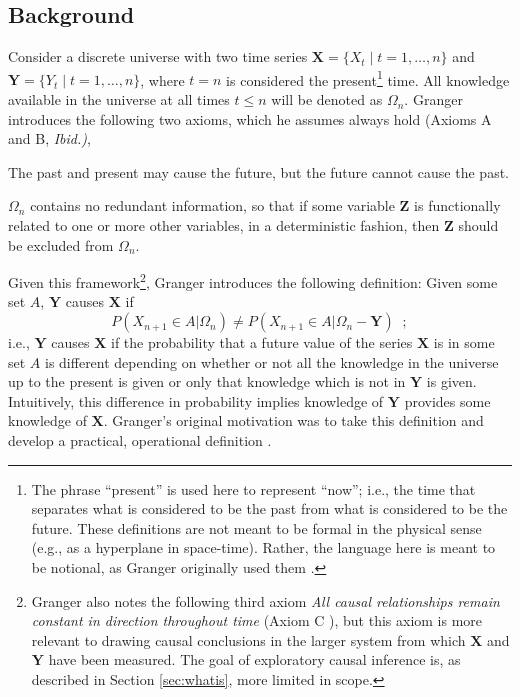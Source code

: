 \subsection{Background}
\label{sec:GCback}
Consider a discrete universe with two time series $\mathbf{X}=\{X_t\;|\; t=1,\ldots,n\}$ and $\mathbf{Y}=\{Y_t\;|\; t=1,\ldots,n\}$, where $t=n$ is considered the present\footnote{The phrase ``present'' is used here to represent ``now''; i.e., the time that separates what is considered to be the past from what is considered to be the future.  These definitions are not meant to be formal in the physical sense (e.g., as a hyperplane in space-time).  Rather, the language here is meant to be notional, as Granger originally used them \cite{Granger1980}.} time.  All knowledge available in the universe at all times $t\le n$ will be denoted as $\Omega_n$.  Granger introduces the following two axioms, which he assumes always hold \cite{Granger1980} (Axioms A and B, {\em Ibid.)},
\begin{ax}
The past and present may cause the future, but the future cannot cause the past. 
\end{ax}
\begin{ax}
$\Omega_n$ contains no redundant information, so that if some variable $\mathbf{Z}$ is functionally related to one or more other variables, in a deterministic fashion, then $\mathbf{Z}$ should be excluded from $\Omega_n$. 
\end{ax}

Given this framework\footnote{Granger also notes the following third axiom {\em All causal relationships remain constant in direction throughout time} (Axiom C \cite{Granger1980}), but this axiom is more relevant to drawing causal conclusions in the larger system from which $\mathbf{X}$ and $\mathbf{Y}$ have been measured.  The goal of exploratory causal inference is, as described in Section \ref{sec:whatis}, more limited in scope.}, Granger introduces the following definition: Given some set $A$, $\mathbf{Y}$ causes $\mathbf{X}$ if
\begin{equation}
\label{eq:GCdef}
P(X_{n+1}\in A|\Omega_n) \neq P(X_{n+1}\in A|\Omega_n-\mathbf{Y})\;\;;
\end{equation}
i.e., $\mathbf{Y}$ causes $\mathbf{X}$ if the probability that a future value of the series $\mathbf{X}$ is in some set $A$ is different depending on whether or not all the knowledge in the universe up to the present is given or only that knowledge which is not in $\mathbf{Y}$ is given.  Intuitively, this difference in probability implies knowledge of $\mathbf{Y}$ provides some knowledge of $\mathbf{X}$.  Granger's original motivation was to take this definition and develop a practical, operational definition \cite{Granger1980,Granger1969,Granger1963,Granger1988}.

